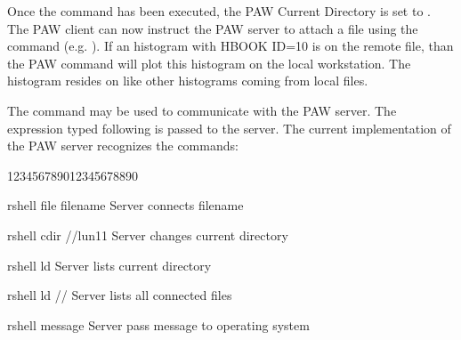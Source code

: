 Once the  command has been executed, the PAW Current Directory
is set to . The PAW client can now instruct the PAW server to
attach a file using the  command (e.g. ). If an
histogram with HBOOK ID=10 is on the remote file, than the PAW command
will plot this histogram on the local workstation. The histogram resides
on  like other histograms coming from local files.
 
The  command may be used to communicate with the PAW server.
The expression typed following  is passed to the server. The current
implementation of the PAW server recognizes the commands:
\begin{DLtt}{123456789012345678890}
\item[rshell file filename]Server connects filename
\item[rshell cdir //lun11] Server changes current directory
\item[rshell ld]           Server lists current directory
\item[rshell ld //]        Server lists all connected files
\item[rshell message]      Server pass message to operating system
\end{DLtt}
 
